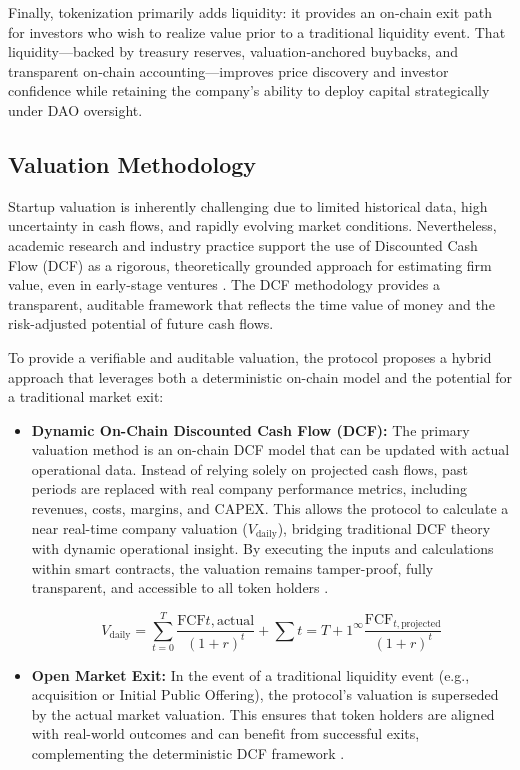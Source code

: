 \documentclass[conference]{IEEEtran}
\begin{document}
Finally, tokenization primarily adds liquidity: it provides an on‑chain exit path for investors who wish to realize value prior to a traditional liquidity event. That liquidity—backed by treasury reserves, valuation‑anchored buybacks, and transparent on‑chain accounting—improves price discovery and investor confidence while retaining the company’s ability to deploy capital strategically under DAO oversight.
%
\subsection{Valuation Methodology}
Startup valuation is inherently challenging due to limited historical data, high uncertainty in cash flows, and rapidly evolving market conditions. Nevertheless, academic research and industry practice support the use of Discounted Cash Flow (DCF) as a rigorous, theoretically grounded approach for estimating firm value, even in early-stage ventures \cite{Laitinen2019,Olsen2019,Arefmanesh2025,Montani2020,Steiger2010}. The DCF methodology provides a transparent, auditable framework that reflects the time value of money and the risk-adjusted potential of future cash flows.

To provide a verifiable and auditable valuation, the protocol proposes a hybrid approach that leverages both a deterministic on-chain model and the potential for a traditional market exit:

\begin{itemize}
\item \textbf{Dynamic On-Chain Discounted Cash Flow (DCF):}
The primary valuation method is an on-chain DCF model that can be updated with actual operational data. Instead of relying solely on projected cash flows, past periods are replaced with real company performance metrics, including revenues, costs, margins, and CAPEX. This allows the protocol to calculate a near real-time company valuation ($V_\text{daily}$), bridging traditional DCF theory with dynamic operational insight. By executing the inputs and calculations within smart contracts, the valuation remains tamper-proof, fully transparent, and accessible to all token holders \cite{Laitinen2019,Steiger2010}.

\begin{equation}
V_{\text{daily}} = \sum_{t=0}^{T} \frac{\text{FCF}{t,\text{actual}}}{(1+r)^t} + \sum{t=T+1}^{\infty} \frac{\text{FCF}_{t,\text{projected}}}{(1+r)^t}
\end{equation}


\item \textbf{Open Market Exit:}
In the event of a traditional liquidity event (e.g., acquisition or Initial Public Offering), the protocol's valuation is superseded by the actual market valuation. This ensures that token holders are aligned with real-world outcomes and can benefit from successful exits, complementing the deterministic DCF framework \cite{Montani2020,Olsen2019}.
\end{itemize}
\end{document}
